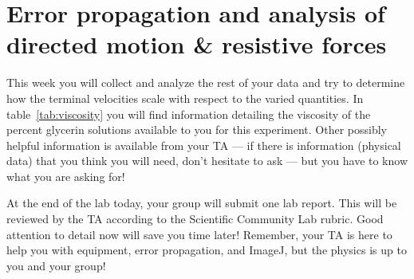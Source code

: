 \section{Error propagation and analysis of directed motion \& resistive forces}
This week you will collect and analyze the rest of your data and try to determine how the terminal velocities scale with respect to the varied quantities.
In table~\ref{tab:viscosity} you will find information detailing the viscosity of the percent glycerin solutions available to you for this experiment.
Other possibly helpful information is available from your TA — if there is information (physical data) that you think you will need, don't hesitate to ask — but you have to know what you are asking for! \par
At the end of the lab today, your group will submit one lab report.
This will be reviewed by the TA according to the Scientific Community Lab rubric.
Good attention to detail now will save you time later!
Remember, your TA is here to help you with equipment, error propagation, and ImageJ, but the physics is up to you and your group!

